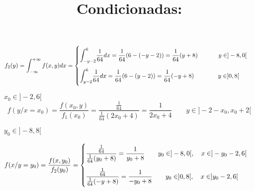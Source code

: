 \documentclass[tikz]{article}
\def\stretchint#1{\vcenter{\hbox{\stretchto[440]{\displaystyle\int}{#1}}}}
\begin{document}
\[f_2(y) = \int_{-\infty}^{+\infty} f(x,y) dx = \begin{cases} ~
    \vspace{-4mm}\\ \stretchint{5ex}_{\hspace{-1.5mm}-y-2}^6
    \dfrac{1}{64} dx = \dfrac{1}{64}(6-(-y-2))=\dfrac{1}{64}(y+8)
    \hspace{12mm} y \in ]-8,0[ \vspace{3mm}\\
    \stretchint{5ex}_{\hspace{-1.5mm}y-2}^6 \dfrac{1}{64} dx =
    \dfrac{1}{64}(6-(y-2))=\dfrac{1}{64}(-y+8) \hspace{14mm} y \in
    ]0,8[ \\ \vspace{-4mm} ~
  \end{cases}\]

\newpage

\title{\large \textbf{Condicionadas:}}

\vspace{7mm}

$x_0 \in ]-2,6[$
\[f(y/x=x_0)=\frac{f(x_0,y)}{f_1(x_0)}=\frac{\frac{1}{64}}{\frac{1}{64}(2x_0+4)}=\frac{1}{2x_0+4}
\qquad y \in ]-2-x_0,x_0+2[\]

$y_0 \in ]-8,8[$

\[f(x/y=y_0)=\frac{f(x,y_0)}{f_2(y_0)} = \begin{cases} ~ \vspace{-4mm}
\\ \dfrac{\frac{1}{64}}{\frac{1}{64}(y_0+8)} = \dfrac{1}{y_0+8} \qquad
y_0 \in ]-8,0[, \quad x \in ]-y_0-2,6[ \vspace{3mm} \\
\dfrac{\frac{1}{64}}{\frac{1}{64}(-y+8)} = \dfrac{1}{-y_0+8} \qquad
y_0 \in ]0,8[, \quad x \in ]y_0-2,6[ \\ \vspace{-4mm} ~
  \end{cases}\]
\end{document}
